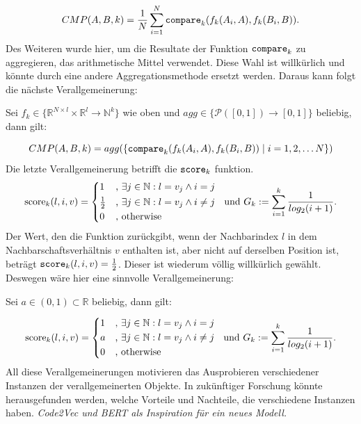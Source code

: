 \documentclass[12pt,letterpaper,ngerman]{article}
\begin{document}
\[
  CMP(A,B,k) = 
  \frac{1}{N}\sum_{i = 1}^{N} 
  \verb|compare|_k(f_k(A_i,A),f_k(B_i, B)).
\]
Des Weiteren wurde hier, um die Resultate der Funktion 
$\verb|compare|_k$ zu aggregieren, das arithmetische Mittel
verwendet. Diese Wahl ist willkürlich und könnte durch eine 
andere Aggregationsmethode ersetzt werden. Daraus kann 
folgt die nächste Verallgemeinerung:
\begin{center}
  Sei $f_k \in \{\mathbb{R}^{N\times l}
  \times \mathbb{R}^l \to \mathbb{N}^k\}$ wie oben und 
  $agg \in \{\mathcal{P}([0,1]) \to [0,1]\}$ beliebig, 
  dann gilt:
\end{center}
\[ 
  CMP(A,B,k) = 
  agg(\{\verb|compare|_k(f_k(A_i,A),f_k(B_i,B)) 
    \hspace{0.1cm}|\hspace{0.1cm} i = 1,2, \dots N\})
\]
Die letzte Verallgemeinerung betrifft die $\verb|score|_k$
funktion. 
\[
  \text{score}_k(l,i,v) = \begin{cases*} 
      1 & , $\exists j \in \mathbb{N}: l = v_j \land i = j$   \\
      \frac{1}{2} & , $\exists j \in \mathbb{N}: l = v_j \land i \neq j$\\
      0   & , \text{otherwise}
    \end{cases*}  \text{  und  }
    G_k := \sum_{i=1}^{k} \frac{1}{log_2(i+1)}.
\]
Der Wert, den die Funktion zurückgibt, wenn der Nachbarindex 
$l$ in dem Nachbarschaftsverhältnis $v$ enthalten ist,
aber nicht auf derselben Position ist,
beträgt $\verb|score|_k(l,i,v) = \frac{1}{2}$. 
Dieser ist wiederum völlig willkürlich gewählt.
Deswegen wäre hier eine sinnvolle Verallgemeinerung:
\begin{center}
  Sei $a \in (0,1) \subset \mathbb{R}$ beliebig, dann gilt:
\end{center}
\[
  \text{score}_k(l,i,v) = \begin{cases*} 
      1 & , $\exists j \in \mathbb{N}: l = v_j \land i = j$   \\
      a & , $\exists j \in \mathbb{N}: l = v_j \land i \neq j$\\
      0 & , \text{otherwise}
    \end{cases*}  \text{  und  }
    G_k := \sum_{i=1}^{k} \frac{1}{log_2(i+1)}.
\]
All diese Verallgemeinerungen motivieren das
Ausprobieren verschiedener Instanzen der verallgemeinerten 
Objekte. In zukünftiger Forschung könnte herausgefunden  
werden, welche Vorteile und Nachteile, die verschiedene 
Instanzen haben.
\textit{Code2Vec und BERT als Inspiration für ein neues Modell.} 
\end{document}
